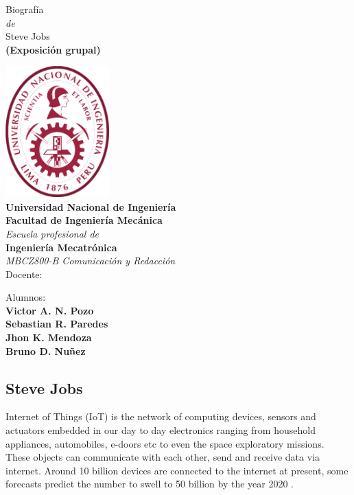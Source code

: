\documentclass[notumble,10pt,a4paper]{leaflet}
\begin{document}
\begin{center}
	{\Large Biografía} \\[.3cm]
	\textit{de}\\[.4cm]
	{\huge {Steve Jobs}}\\ [.3cm]
	\textbf{{\large (Exposición grupal)}}\\[.5cm]
	\vfill
	
	\includegraphics[width=4cm]{img/logouni.png}\\
	\label{fig:logo}
	\textbf{Universidad Nacional de Ingeniería}\\
	{\large \textbf{Facultad de Ingeniería Mecánica}}\\[.5cm]
	\textit{\large{Escuela profesional de}}\\[.3cm]
	{\large \textbf{Ingeniería Mecatrónica}}\\[.5cm]
	\textit{MBCZ800-B Comunicación y Redacción}\\
	\large{Docente:\\
		}
	
	\vfill
	Alumnos:\\ 
	\textbf{Victor A. N. Pozo\\
		Sebastian R. Paredes\\
		Jhon K. Mendoza\\
		Bruno D. Nuñez}\\
\end{center}


\thispagestyle{empty} 

\newpage
\subsection{\large{Steve Jobs}}
Internet of Things (IoT) is the network of computing devices, sensors and actuators embedded in our day to day electronics ranging from household appliances, automobiles, e-doors etc to even the space exploratory missions. These objects can communicate with each other, send and receive data via internet. Around 10 billion devices are connected to the internet at present, some forecasts predict the number to swell to 50 billion by the year 2020 \cite{cite:everyshi}.
\end{document}
